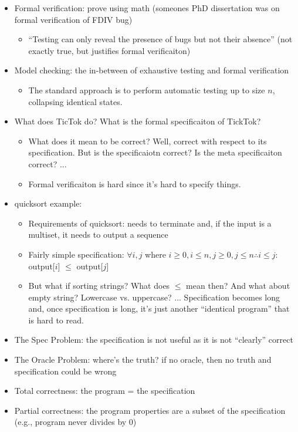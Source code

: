 \documentclass[twoside]{article}
\begin{document}
\begin{itemize}
  \item Formal verification: prove using math (someones PhD dissertation was on formal verification of FDIV bug)
	\begin{itemize}	
		\item ``Testing can only reveal the presence of bugs but not their absence'' (not exactly true, but justifies formal verificaiton)
	\end{itemize}
  \item Model checking: the in-between of exhaustive testing and formal verification
	\begin{itemize}	
		\item The standard approach is to perform automatic testing up to size $n$, collapsing identical states.
	\end{itemize}
  \item What does TicTok do? What is the formal specificaiton of TickTok?
	\begin{itemize}	
		\item What does it mean to be correct? Well, correct with respect to its specification. But is the specificaiotn correct? Is the meta specificaiton correct? ...
		\item Formal verificaiton is hard since it's hard to specify things.
	\end{itemize}
  \item quicksort example:
	\begin{itemize}	
		\item Requirements of quicksort: needs to terminate and, if the input is a multiset, it needs to output a sequence
		\item Fairly simple specification: $\forall  i, j $ where $ i \geq 0, i \leq n, j \geq 0, j \leq n \therefore i \leq j :$ output[$i$] $\leq$ output[$j$]
		\item But what if sorting strings? What does $\leq$ mean then? And what about empty string? Lowercase vs. uppercase? ... Specification becomes long and, once specification is long, it's just another ``identical program'' that is hard to read.
	\end{itemize}
  \item The Spec Problem: the specification is not useful as it is not ``clearly'' correct
  \item The Oracle Problem: where's the truth? if no oracle, then no truth and specification could be wrong
  \item Total correctness: the program = the specification
  \item Partial correctness: the program properties are a subset of the specification (e.g., program never divides by 0)
\end{itemize}
\end{document}
